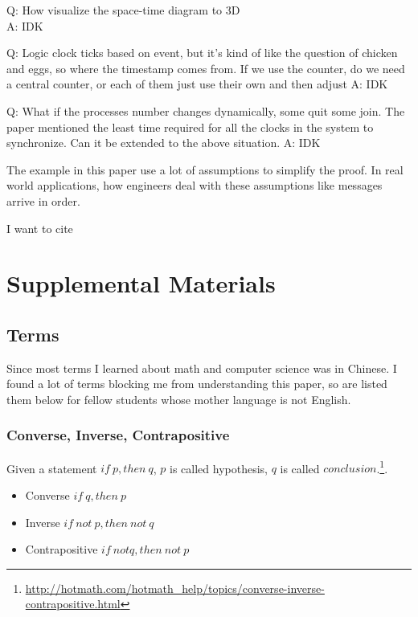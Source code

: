 \documentclass[12pt,a4paper,oneside]{article}
\begin{document}
Q: How visualize the space-time diagram to 3D \\
A: IDK

Q: Logic clock ticks based on event, but it's kind of like the question of chicken and eggs, so where the timestamp comes from.
If we use the counter, do we need a central counter, or each of them just use their own and then adjust
A: IDK

Q: What if the processes number changes dynamically, some quit some join. The paper mentioned the least time required for all the
clocks in the system to synchronize. Can it be extended to the above situation.
A: IDK

The example in this paper use a lot of assumptions to simplify the proof.
In real world applications, how engineers deal with these assumptions like messages
arrive in order.

I want to cite\cite{l}

\section{Supplemental Materials}

\subsection{Terms} \label{l1}

Since most terms I learned about math and computer science was in Chinese. I found a lot of terms blocking
me from understanding this paper, so are listed them below for fellow students whose mother language is not English.

\medskip


\subsubsection{Converse, Inverse, Contrapositive}

Given a statement $if\ p, then\ q$, $p$ is called hypothesis, $q$ is called $conclusion$.\footnote{\url{http://hotmath.com/hotmath_help/topics/converse-inverse-contrapositive.html}}.

\begin{itemize}
    \item Converse  $if\ q, then\ p$
    \item Inverse $if\ not\ p, then\ not\ q$
    \item Contrapositive $if\ not q, then\ not\ p$
\end{itemize}
\end{document}

